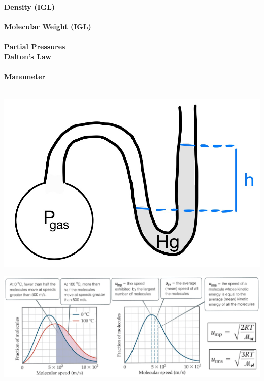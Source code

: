 \begin{minipage}{0.33\linewidth}
    \textbf{Density (IGL)}\\
    \\
    \textbf{Molecular Weight (IGL)}\\
    \\
    \textbf{Partial Pressures \\ Dalton's Law}\\
    \\
    \textbf{Manometer}\\
    \\
    \begin{center}
        \includegraphics[width = 0.8\linewidth]{images/Manometer.jpeg}
    \end{center}
\end{minipage}
\begin{center}
    \includegraphics[width = 0.9\linewidth]{images/gas_kinetics.jpeg}
\end{center}

